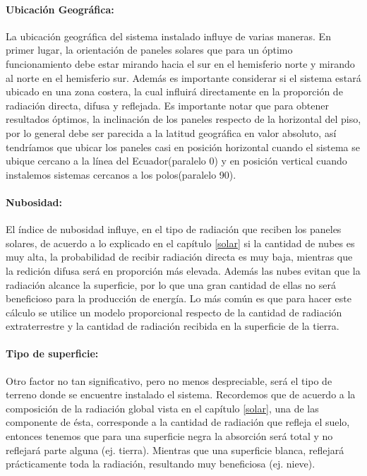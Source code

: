 \paragraph{Ubicación Geográfica:}
La ubicación geográfica del sistema instalado influye de varias maneras. En primer lugar, la orientación de paneles solares que para un óptimo funcionamiento debe estar mirando hacia el sur en el hemisferio norte y mirando al norte en el hemisferio sur. Además es importante considerar si el sistema estará ubicado en una zona costera, la cual influirá directamente en la proporción de radiación directa, difusa y reflejada. Es importante notar que para obtener resultados óptimos, la inclinación de los paneles respecto de la horizontal del piso, por lo general debe ser parecida a la latitud geográfica en valor absoluto, así tendríamos que ubicar los paneles casi en posición horizontal cuando el sistema se ubique cercano a la línea del Ecuador(paralelo 0) y en posición vertical cuando instalemos sistemas cercanos a los polos(paralelo 90).

\paragraph{Nubosidad:}
El índice de nubosidad influye, en el tipo de radiación que reciben los paneles solares, de acuerdo a lo explicado en el capítulo \ref{solar} si la cantidad de nubes es muy alta, la probabilidad de recibir radiación directa es muy baja, mientras que la redición difusa será en proporción más elevada. Además las nubes evitan que la radiación alcance la superficie, por lo que una gran cantidad de ellas no será beneficioso para la producción de energía. Lo más común es que para hacer este cálculo se utilice un modelo proporcional respecto de la cantidad de radiación extraterrestre y la cantidad de radiación recibida en la superficie de la tierra.

\paragraph{Tipo de superficie:}
Otro factor no tan significativo, pero no menos despreciable, será el tipo de terreno donde se encuentre instalado el sistema. Recordemos que de acuerdo a la composición de la radiación global vista en el capítulo \ref{solar}, una de las componente de ésta, corresponde a la cantidad de radiación que refleja el suelo, entonces tenemos que para una superficie negra la absorción será total y no reflejará parte alguna (ej. tierra). Mientras que una superficie blanca, reflejará prácticamente toda la radiación, resultando muy beneficiosa (ej. nieve).\\

